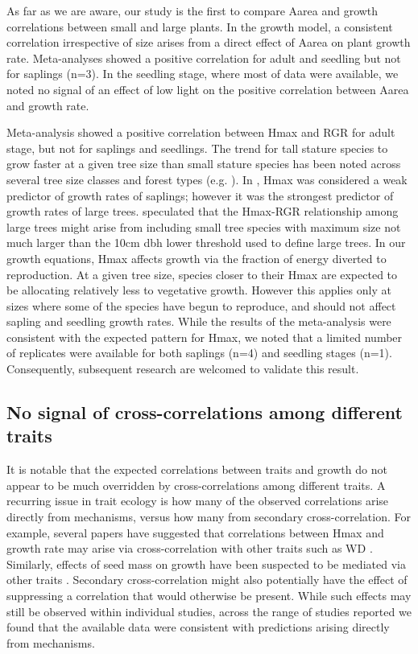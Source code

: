 \documentclass[a4paper,11pt]{article}
\begin{document}
As far as we are aware, our study is the first to compare Aarea and growth correlations between small and large plants. In the growth model, a consistent correlation irrespective of size arises from a direct effect of Aarea on plant growth rate. Meta-analyses showed a positive correlation for adult and seedling but not for saplings (n=3). In the seedling stage, where most of data were available, we noted no signal of an effect of low light on the positive correlation between Aarea and growth rate.

Meta-analysis showed a positive correlation between Hmax and RGR for adult stage, but not for saplings and seedlings. The trend for tall stature species to grow faster at a given tree size than small stature species has been noted across several tree size classes and forest types (e.g. \citealt{Thomas:1996do,Poorter:2008iu,Wright:2010tp,Herault:2011dd,Ruger:2012jv,Iida:2014ep}). In \citet{Wright:2010tp}, Hmax was considered a weak predictor of growth rates of saplings; however it was the strongest predictor of growth rates of large trees. \citet{Poorter:2008iu} speculated that the Hmax-RGR relationship among large trees might arise from including small tree species with maximum size not much larger than the 10cm dbh lower threshold used to define large trees. In our growth equations, Hmax affects growth via the fraction of energy diverted to reproduction. At a given tree size, species closer to their Hmax are expected to be allocating relatively less to vegetative growth. However this applies only at sizes where some of the species have begun to reproduce, and should not affect sapling and seedling growth rates. While the results of the meta-analysis were consistent with the expected pattern for Hmax, we noted that a limited number of replicates were available for both saplings (n=4) and seedling stages (n=1). Consequently, subsequent research are welcomed to validate this result. 


\subsection*{No signal of cross-correlations among different traits}

It is notable that the expected correlations between traits and growth do not appear to be much overridden by cross-correlations among different traits. A recurring issue in trait ecology is how many of the observed correlations arise directly from mechanisms, versus how many from secondary cross-correlation. For example, several papers have suggested that correlations between Hmax and growth rate may arise via cross-correlation with other traits such as WD \citep{Thomas:1996do, Poorter:2006vb, Wright:2010tp}. Similarly, effects of seed mass on growth have been suspected to be mediated via other traits \citep{Shipley:1990js,Westoby:2002ft,Poorter:2006vb}. Secondary cross-correlation might also potentially have the effect of suppressing a correlation that would otherwise be present. While such effects may still be observed within individual studies, across the range of studies reported we found that the available data were consistent with predictions arising directly from mechanisms.
\end{document}
